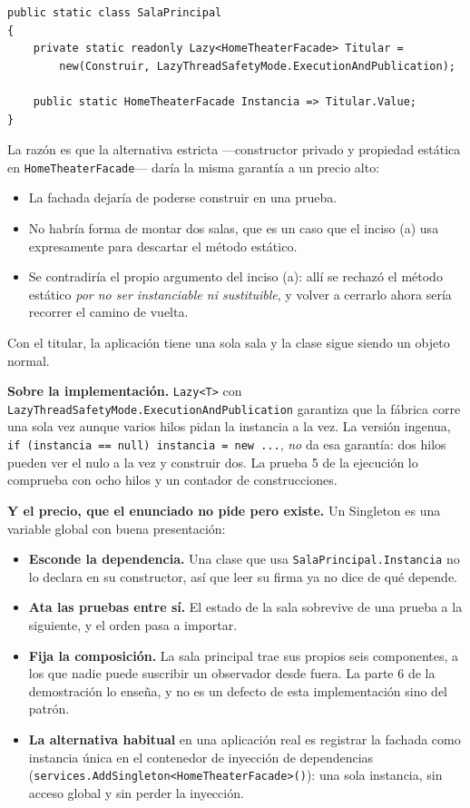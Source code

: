 {\small
\begin{verbatim}
public static class SalaPrincipal
{
    private static readonly Lazy<HomeTheaterFacade> Titular =
        new(Construir, LazyThreadSafetyMode.ExecutionAndPublication);

    public static HomeTheaterFacade Instancia => Titular.Value;
}
\end{verbatim}
}

La razón es que la alternativa estricta —constructor privado y propiedad estática en
\texttt{HomeTheaterFacade}— daría la misma garantía a un precio alto:

\begin{itemize}[leftmargin=1.2cm]
    \item La fachada dejaría de poderse construir en una prueba.
    \item No habría forma de montar dos salas, que es un caso que el inciso (a) usa
          expresamente para descartar el método estático.
    \item Se contradiría el propio argumento del inciso (a): allí se rechazó el método
          estático \emph{por no ser instanciable ni sustituible}, y volver a cerrarlo ahora
          sería recorrer el camino de vuelta.
\end{itemize}

Con el titular, la aplicación tiene una sola sala y la clase sigue siendo un objeto normal.

\textbf{Sobre la implementación.} \texttt{Lazy<T>} con
\texttt{LazyThreadSafetyMode.\allowbreak ExecutionAndPublication} garantiza que la fábrica
corre una sola vez aunque varios hilos pidan la instancia a la vez. La versión ingenua,
\texttt{if (instancia == null) instancia = new ...}, \emph{no} da esa garantía: dos hilos
pueden ver el nulo a la vez y construir dos. La prueba 5 de la ejecución lo comprueba con ocho
hilos y un contador de construcciones.

\textbf{Y el precio, que el enunciado no pide pero existe.} Un Singleton es una variable
global con buena presentación:

\begin{itemize}[leftmargin=1.2cm]
    \item \textbf{Esconde la dependencia.} Una clase que usa \texttt{SalaPrincipal.Instancia}
          no lo declara en su constructor, así que leer su firma ya no dice de qué depende.
    \item \textbf{Ata las pruebas entre sí.} El estado de la sala sobrevive de una prueba a
          la siguiente, y el orden pasa a importar.
    \item \textbf{Fija la composición.} La sala principal trae sus propios seis componentes,
          a los que nadie puede suscribir un observador desde fuera. La parte 6 de la
          demostración lo enseña, y no es un defecto de esta implementación sino del patrón.
    \item \textbf{La alternativa habitual} en una aplicación real es registrar la fachada como
          instancia única en el contenedor de inyección de dependencias
          (\texttt{services.AddSingleton<HomeTheaterFacade>()}): una sola instancia, sin
          acceso global y sin perder la inyección.
\end{itemize}


